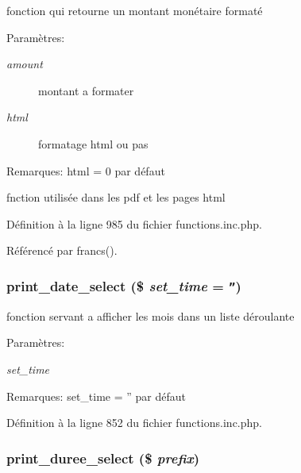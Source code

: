 fonction qui retourne un montant mon\'{e}taire format\'{e} 

\begin{Desc}
\item[Param\`{e}tres:]
\begin{description}
\item[{\em amount}]montant a formater \item[{\em html}]formatage html ou pas \end{description}
\end{Desc}
\begin{Desc}
\item[Remarques:]html = 0 par d\'{e}faut 

fnction utilis\'{e}e dans les pdf et les pages html \end{Desc}


D\'{e}finition \`{a} la ligne 985 du fichier functions.inc.php.

R\'{e}f\'{e}renc\'{e} par francs().\hypertarget{functions_8inc_8php_a35}{
\subsubsection[print\_\-date\_\-select]{\setlength{\rightskip}{0pt plus 5cm}print\_\-date\_\-select (\$ {\em set\_\-time} = {\tt ''})}}
\label{functions_8inc_8php_a35}


fonction servant a afficher les mois dans un liste d\'{e}roulante 

\begin{Desc}
\item[Param\`{e}tres:]
\begin{description}
\item[{\em set\_\-time}]\end{description}
\end{Desc}
\begin{Desc}
\item[Remarques:]set\_\-time = '' par d\'{e}faut \end{Desc}


D\'{e}finition \`{a} la ligne 852 du fichier functions.inc.php.\hypertarget{functions_8inc_8php_a37}{
\subsubsection[print\_\-duree\_\-select]{\setlength{\rightskip}{0pt plus 5cm}print\_\-duree\_\-select (\$ {\em prefix})}}
\label{functions_8inc_8php_a37}


